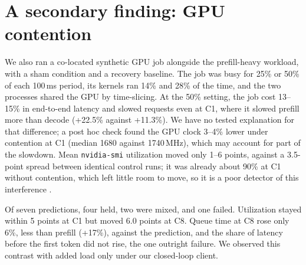 \section{A secondary finding: GPU contention}
\label{sec:contention}

We also ran a co-located synthetic GPU job alongside the prefill-heavy workload, with a
sham condition and a recovery baseline. The job was busy for 25\% or 50\% of each
100\,ms period, its kernels ran 14\% and 28\% of the time, and the two processes
shared the GPU by time-slicing. At the 50\% setting, the job
cost 13--15\% in end-to-end latency and slowed requests even at C1, where it slowed
prefill more than decode (+22.5\% against +11.3\%). We have no tested explanation for
that difference; a post hoc check found the GPU clock 3--4\% lower under contention at
C1 (median 1680 against 1740\,MHz), which may account for part of the slowdown. Mean
\texttt{nvidia-smi} utilization moved only 1--6 points, against a 3.5-point spread
between identical control runs; it was already about 90\% at C1 without
contention, which left little room to move, so it is a poor detector of this
interference \citep{nvidiasmi}.

Of seven predictions, four held, two were mixed, and one failed. Utilization stayed
within 5 points at C1 but moved 6.0 points at C8. Queue time at C8 rose only 6\%, less
than prefill (+17\%), against the prediction, and the share of latency before the
first token did not rise, the one outright failure. We observed this contrast with
added load only under our closed-loop client.
